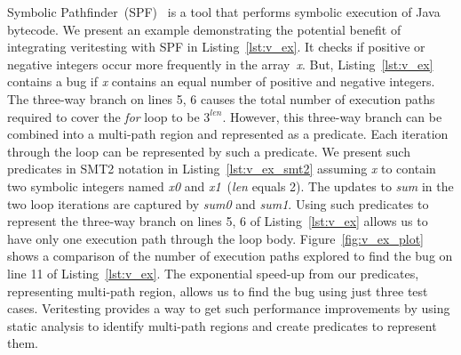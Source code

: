 Symbolic Pathfinder~(SPF)~\cite{spf} is a tool that performs symbolic execution of Java bytecode.
%
%
We present an example demonstrating the potential benefit of integrating veritesting with SPF in Listing~\ref{lst:v_ex}.
%
It checks if positive or negative integers occur more frequently in the
array~\textit{x}.
%
But, Listing~\ref{lst:v_ex} contains a bug if \textit{x} contains an
equal number of positive and negative integers.
%
The three-way branch on lines 5, 6 causes the total number of execution
paths required to cover the \textit{for} loop to be $3^{\textit{len}}$.
%
However, this three-way branch can be combined into a multi-path region
and represented as a predicate.
%
Each iteration through the loop can be represented by such a predicate.
%
We present such predicates in SMT2 notation in
Listing~\ref{lst:v_ex_smt2} assuming \textit{x} to contain two symbolic
integers named \textit{x0} and \textit{x1}~(\textit{len} equals 2).
%
The updates to \textit{sum} in the two loop iterations are captured by
\textit{sum0} and \textit{sum1}.
%
Using such predicates to represent the three-way branch on lines 5, 6 of
Listing~\ref{lst:v_ex} allows us to have only one execution path through
the loop body.
%
Figure~\ref{fig:v_ex_plot} shows a comparison of the number of execution
paths explored to find the bug on line 11 of Listing~\ref{lst:v_ex}.
%
The exponential speed-up from our predicates, representing multi-path
region, allows us to find
the bug using just three test cases.
%
Veritesting provides a way to get such performance improvements by using
static analysis to identify multi-path
regions and create predicates to represent them.
%

%
